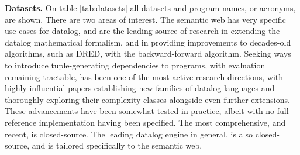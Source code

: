\documentclass[sigconf,screen,review,natbib]{acmart}
\theoremstyle{definition}
\begin{document}
\textbf{Datasets.} On table \ref{tab:datasets} all datasets and program names, or acronyms, are shown. There are two areas of interest. The semantic web has very
specific use-cases for datalog, and are the leading source of research in extending the datalog mathematical formalism, and in providing improvements to decades-old
algorithms, such as DRED, with the backward-forward algorithm\cite{dredbf}. Seeking ways to introduce tuple-generating dependencies to programs, with evaluation remaining
tractable, has been one of the most active research directions, with highly-influential papers establishing new families of datalog languages\cite{datalog_plus_minus} and
thoroughly exploring their complexity classes alongside even further extensions\cite{sticky,warded,monadic}. These advancements have been somewhat tested in practice, albeit
with no full reference implementation having been specified. The most comprehensive, and recent, is closed-source\cite{vadalog}. The leading datalog engine in general, is
also closed-source\cite{rdfox}, and is tailored specifically to the semantic web.
\end{document}
